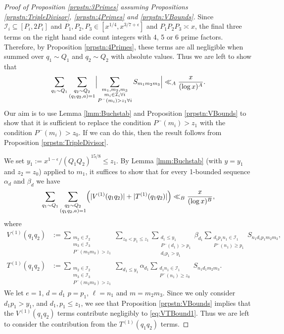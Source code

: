\documentclass[10pt]{amsart}
\theoremstyle{plain}
\numberwithin{equation}{section}
\begin{document}
\begin{proof}[Proof of Proposition \ref{prpstn:3Primes} assuming Propositions \ref{prpstn:TripleDivisor}, \ref{prpstn:4Primes} and \ref{prpstn:VBounds}]
Since $\mathcal{I}_i\subseteq[P_i,2P_i]$ and $P_1,P_2,P_3\in [x^{1/4},x^{3/7+\epsilon}]$ and $P_1P_2P_3\asymp x$, the final three terms on the right hand side count integers with 4, 5 or 6 prime factors. Therefore, by Proposition \ref{prpstn:4Primes}, these terms are all negligible when summed over $q_1\sim Q_1$ and $q_2\sim Q_2$ with absolute values. Thus we are left to show that
\[
\sum_{q_1\sim Q_1}\sum_{\substack{ q_2\sim Q_2\\ (q_1q_2,a)=1}}\Bigl|\sum_{\substack{m_1,m_2,m_3\\ m_i\in \mathcal{I}_i\forall i\\ P^-(m_i)>z_1 \forall i}}S_{m_1m_2m_3}\Bigr|\ll_A \frac{x}{(\log{x})^A}.
\]
Our aim is to use Lemma \ref{lmm:Buchstab} and Proposition \ref{prpstn:VBounds} to show that it is sufficient to replace the condition $P^-(m_i)>z_1$ with the condition $P^-(m_i)>z_0$. If we can do this, then the result follows from Proposition \ref{prpstn:TripleDivisor}.

We set $y_1:=x^{1-\epsilon}/(Q_1Q_2)^{15/8}\le z_1$. By Lemma \ref{lmm:Buchstab} (with $y=y_1$ and $z_2=z_0$) applied to $m_1$, it suffices to show that for every 1-bounded sequence $\alpha_d$ and $\beta_d$ we have
\begin{equation}
\sum_{q_1\sim Q_1}\sum_{\substack{ q_2\sim Q_2\\ (q_1q_2,a)=1}}\Bigl(|V^{(1)}(q_1q_2)|+|T^{(1)}(q_1q_2)|\Bigr)\ll_B\frac{x}{(\log{x})^B},
\label{eq:VTBound1}
\end{equation}
where
\begin{align*}
V^{(1)}(q_1q_2)&:=\sum_{\substack{m_2\in\mathcal{I}_2\\ m_3\in \mathcal{I}_3\\ P^-(m_2m_3)>z_1}}\sum_{z_0<p_1\le z_1}\sum_{\substack{d_1\le y_1\\ P^-(d_1)>p_1\\ d_1 p_1>y_1}}\beta_{d_1}\sum_{\substack{d_1 p_1 n_1\in \mathcal{I}_1\\ P^-(n_1)\ge p_1}}S_{n_1 d_1 p_1 m_2 m_3},\\
T^{(1)}(q_1q_2)&:=\sum_{\substack{m_2\in\mathcal{I}_2\\ m_3\in \mathcal{I}_3\\ P^-(m_2m_3)>z_1}}\sum_{d_1\le y_1}\alpha_{d_1}\sum_{\substack{d_1 n_1\in \mathcal{I}_1\\ P^-(n_1)\ge z_0}}S_{n_1 d_1 m_2 m_3}.
\end{align*}
We let $e=1$, $d=d_1$ $p=p_1$, $\ell=n_1$ and $m=m_2m_3$. Since we only consider $d_1p_1>y_1$, and $d_1,p_1\le z_1$, we see that Proposition \ref{prpstn:VBounds} implies that the $V^{(1)}(q_1q_2)$ terms contribute negligibly to \eqref{eq:VTBound1}. Thus we are left to consider the contribution from the $T^{(1)}(q_1q_2)$ terms. 


\end{proof}
\end{document}
